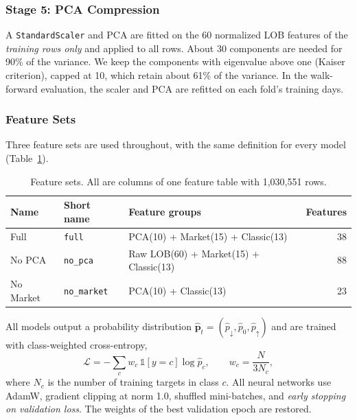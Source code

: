 \subsubsection{Stage 5: PCA Compression}
A \texttt{StandardScaler} and PCA are fitted on the 60 normalized LOB features of the
\emph{training rows only} and applied to all rows. About 30 components are needed for
90\% of the variance. We keep the components with eigenvalue above one (Kaiser
criterion), capped at 10, which retain about 61\% of the variance. In the walk-forward
evaluation, the scaler and PCA are refitted on each fold's training days.

\subsubsection{Feature Sets}
Three feature sets are used throughout, with the same definition for every model
(Table~\ref{tab:featuresets}).

\begin{table}[htbp]
\centering
\caption{Feature sets. All are columns of one feature table with 1,030,551 rows.}
\label{tab:featuresets}
\begin{tabular}{lll r}
\toprule
Name & Short name & Feature groups & Features \\
\midrule
Full      & \texttt{full}      & PCA(10) + Market(15) + Classic(13) & 38 \\
No PCA    & \texttt{no\_pca}    & Raw LOB(60) + Market(15) + Classic(13) & 88 \\
No Market & \texttt{no\_market} & PCA(10) + Classic(13) & 23 \\
\bottomrule
\end{tabular}
\end{table}



All models output a probability distribution
$\hat{\mathbf p}_t = (\hat p_{\downarrow}, \hat p_0, \hat p_{\uparrow})$ and are trained with
class-weighted cross-entropy,
\begin{equation}
  \mathcal{L} = -\sum_{c} w_c\, \mathbb{1}[y=c] \log \hat p_c, \qquad
  w_c = \frac{N}{3 N_c},
\end{equation}
where $N_c$ is the number of training targets in class $c$. All neural networks use
AdamW, gradient clipping at norm 1.0, shuffled mini-batches, and \emph{early stopping on
validation loss}. The weights of the best validation epoch are restored.

